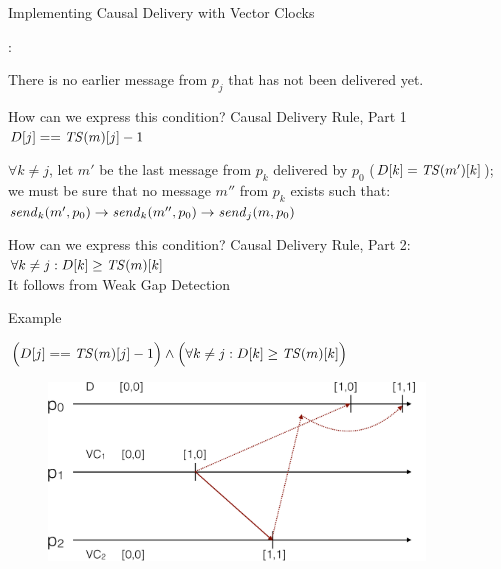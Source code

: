 \begin{frame}{Implementing Causal Delivery with Vector Clocks}

:

\BIL

\item There is no earlier message from $p_j$ that has not been delivered yet.
\begin{overprint}
 \alert{How can we express this condition?}
  \alert{Causal Delivery Rule, Part 1}  $D[j] == \mathit{TS}(m)[j] -1$
\end{overprint}

\item $\forall k \neq j$, let $m'$ be the last message from $p_k$ delivered by $p_0$ ($D[k] = \mathit{TS}(m')[k]$); 
we must be sure that no message $m''$ from $p_k$ exists such that:
$
\mathit{send}_k(m',p_0) \rightarrow \mathit{send}_k(m'',p_0) \rightarrow \mathit{send}_j(m,p_0)
$
\begin{overprint}
  \alert{How can we express this condition?}
\alert{Causal Delivery Rule, Part 2}: $\forall k \neq j: D[k] \geq \mathit{TS}(m)[k]$\\
It follows from Weak Gap Detection
\end{overprint}

\EIL

\end{frame}

\begin{frame}{Example}

\begin{center}
$\Big( D[j] == \mathit{TS}(m)[j] -1 \Big) \wedge \Big( \forall k \neq j: D[k] \geq \mathit{TS}(m)[k] \Big)$
\end{center}

\begin{figure} 
\includegraphics[width=10cm]{figs/03/diagram8}
\end{figure}
\end{frame}

